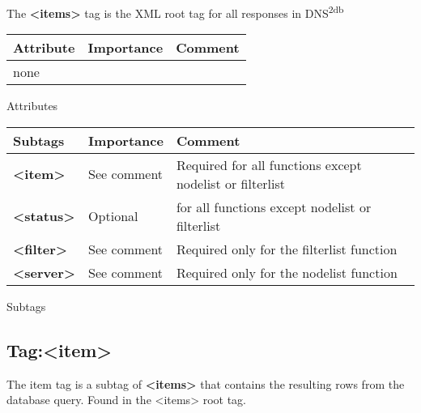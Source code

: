 \documentclass[a4paper]{article}
\newcommand{\xmlv}[1]{\textbf{\textless#1\textgreater}}
\newcommand{\xml}[1]{\textless#1\textgreater}
\newcommand{\dnsdb}{DNS\textsuperscript{2db}}
\begin{document}
    The \xmlv{items} tag is the XML root tag for all responses in \dnsdb 


    
    \begin{center}
        \begin{tabular}{ | p{2.1cm} | p{2cm} | p{9cm} |}
        \hline
        \textbf{Attribute} & \textbf{Importance} & \textbf{Comment}  
        \\ \hline
        none & &
        \\ \hline
        \end{tabular}
        
        \small Attributes
        
        \begin{tabular}{ | p{2.1cm} | p{2cm} | p{9cm} |}
        \hline
        \textbf{Subtags} & \textbf{Importance} & \textbf{Comment}  
        \\ \hline
        \xmlv{item}
        & 
        See comment
        &
        Required for all functions except nodelist or filterlist
        \\ \hline
        \xmlv{status}
        &
        Optional
        &
        for all functions except nodelist or filterlist
        \\ \hline
        \xmlv{filter}
        &
        See comment
        &
        Required only for the filterlist function
        \\ \hline
        \xmlv{server}
        &
        See comment
        &
        Required only for the nodelist function
        \\ \hline
        \end{tabular}
        
        \small Subtags
    \end{center}    


    
    \subsection{Tag:\xml{item}  }
    
    The item tag is a subtag of \xmlv{items} that contains the 
    resulting rows from the database query. Found in the \xml{items} root tag.
    
\end{document}
